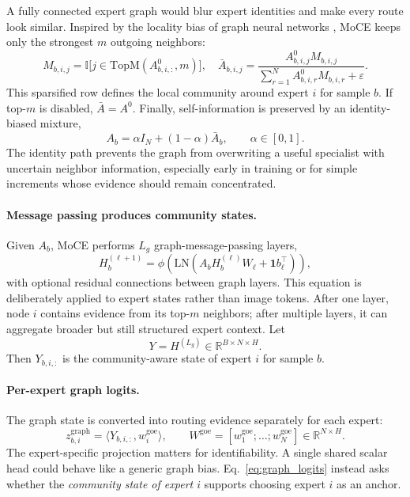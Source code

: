 \documentclass{article}
\theoremstyle{definition}
\theoremstyle{remark}
\begin{document}
A fully connected expert graph would blur expert identities and make every route look similar. Inspired by the locality bias of graph neural networks \cite{kipf2017semisupervised,velickovic2018graph}, MoCE keeps only the strongest $m$ outgoing neighbors:
\begin{equation}
    M_{b,i,j}=\mathbb{I}\!\big[j\in\mathrm{TopM}(A^{0}_{b,i,:},m)\big], \quad
    \bar A_{b,i,j}=\frac{A^{0}_{b,i,j}M_{b,i,j}}{\sum_{r=1}^{N}A^{0}_{b,i,r}M_{b,i,r}+\varepsilon}.
    \label{eq:topm_adj}
\end{equation}
This sparsified row defines the local community around expert $i$ for sample $b$. If top-$m$ is disabled, $\bar A=A^0$. Finally, self-information is preserved by an identity-biased mixture,
\begin{equation}
    A_b=\alpha I_N+(1-\alpha)\bar A_b,
    \qquad \alpha\in[0,1].
    \label{eq:identity_adj}
\end{equation}
The identity path prevents the graph from overwriting a useful specialist with uncertain neighbor information, especially early in training or for simple increments whose evidence should remain concentrated.

\paragraph{Message passing produces community states.}
Given $A_b$, MoCE performs $L_g$ graph-message-passing layers,
\begin{equation}
    H^{(\ell+1)}_{b}=\phi\!\left(\mathrm{LN}\!\left(A_bH^{(\ell)}_{b}W_{\ell}+\mathbf{1}b_{\ell}^{\top}\right)\right),
    \label{eq:graph_conv}
\end{equation}
with optional residual connections between graph layers. This equation is deliberately applied to expert states rather than image tokens. After one layer, node $i$ contains evidence from its top-$m$ neighbors; after multiple layers, it can aggregate broader but still structured expert context. Let
\begin{equation}
    Y=H^{(L_g)}\in\mathbb{R}^{B\times N\times H}.
\end{equation}
Then $Y_{b,i,:}$ is the community-aware state of expert $i$ for sample $b$.

\paragraph{Per-expert graph logits.}
The graph state is converted into routing evidence separately for each expert:
\begin{equation}
    z^{\mathrm{graph}}_{b,i}=\langle Y_{b,i,:},w^{\mathrm{goe}}_{i}\rangle,
    \qquad W^{\mathrm{goe}}=[w^{\mathrm{goe}}_1;\ldots;w^{\mathrm{goe}}_N]\in\mathbb{R}^{N\times H}.
    \label{eq:graph_logits}
\end{equation}
The expert-specific projection matters for identifiability. A single shared scalar head could behave like a generic graph bias. Eq.~\eqref{eq:graph_logits} instead asks whether the \emph{community state of expert $i$} supports choosing expert $i$ as an anchor.
\end{document}
